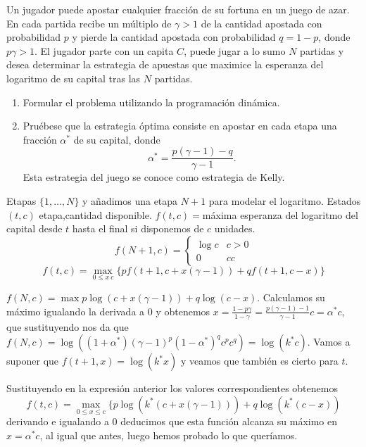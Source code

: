 \documentclass[twoside]{article}
\begin{document}
\newpage 
\begin{ejercicio}{5}
Un jugador puede apostar cualquier fracción de su fortuna en un juego de azar. En cada partida recibe un múltiplo de $\gamma>1$ de la cantidad apostada con probabilidad $p$ y pierde la cantidad apostada con probabilidad $q=1-p$, donde $p\gamma>1$. El jugador parte con un capita $C$, puede jugar a lo sumo $N$ partidas y desea determinar la estrategia de apuestas que maximice la esperanza del logaritmo de su capital tras las $N$ partidas.
\begin{enumerate}
\item Formular el problema utilizando la programación dinámica.
\item Pruébese que la estrategia óptima consiste en apostar en cada etapa una fracción $\alpha^*$ de su capital, donde
$$\alpha^*=\frac{p(\gamma-1)-q}{\gamma-1}.$$
Esta estrategia del juego se conoce como estrategia de Kelly.
\end{enumerate}
\begin{solucion}
Etapas $\{1,\dots, N\}$ y añadimos una etapa $N+1$ para modelar el logaritmo.
Estados $(t,c)$ etapa,cantidad disponible. 
$f(t,c)=$máxima esperanza del logaritmo del capital desde $t$ hasta el final si disponemos de $c$ unidades.
$$f(N+1,c)=\begin{cases}
\log{c} & c>0\\
0 & cc
\end{cases}$$
$$f(t,c)=\max_{0\leq x\ c}\{pf(t+1,c+x(\gamma-1))+qf(t+1,c-x)\}$$ 

$f(N,c)=\max p\log(c+x(\gamma-1))+q\log(c-x)$. Calculamos su máximo igualando la derivada a 0 y obtenemos $x=\frac{1-p\gamma}{1-\gamma}=\frac{p(\gamma-1)-1}{\gamma-1}c=\alpha^* c$, que sustituyendo nos da que $f(N,c)=\log((1+\alpha^*)(\gamma-1)^p(1-\alpha^*)^qc^pc^q)=\log(k^*c)$. Vamos a suponer que $f(t+1,x)=\log(k^*x)$ y veamos que también es cierto para $t$.

Sustituyendo en la expresión anterior los valores correspondientes obtenemos
$$f(t,c)=\max_{0\leq x\leq c}\{p\log(k^*(c+x(\gamma-1)))+q\log(k^*(c-x))$$
derivando e igualando a 0 deducimos que esta función alcanza su máximo en $x=\alpha^*c$, al igual que antes, luego hemos probado lo que queríamos.
\end{solucion}
\end{ejercicio}
\end{document}
